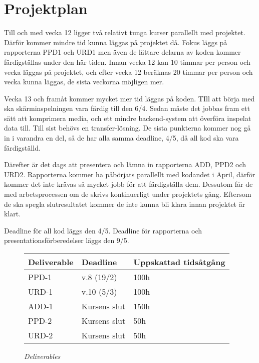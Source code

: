 
\section{Projektplan}
\label{sec:projektplan}
Till och med vecka 12 ligger två relativt tunga kurser parallellt med projektet. Därför kommer mindre tid kunna läggas på projektet då. Fokus läggs på rapporterna PPD1 och URD1 men även de lättare delarna av koden kommer färdigställas under den här tiden. Innan vecka 12 kan 10 timmar per person och vecka läggas på projektet, och efter vecka 12 beräknas 20 timmar per person och vecka kunna läggas, de sista veckorna möjligen mer.

Vecka 13 och framåt kommer mycket mer tid läggas på koden. TIll att börja med ska skärminspelningen vara färdig till den 6/4. Sedan måste det jobbas fram ett sätt att komprimera media, och ett mindre backend-system att överföra inspelat data till. Till sist behövs en transfer-lösning. De sista punkterna kommer nog gå in i varandra en del, så de har alla samma deadline, 4/5, då all kod ska vara färdigställd. 

Därefter är det dags att presentera och lämna in rapporterna ADD, PPD2 och URD2. Rapporterna kommer ha påbörjats parallellt med kodandet i April, därför kommer det inte krävas så mycket jobb för att färdigställa dem. Dessutom får de med arbetsprocessen om de skrivs kontinuerligt under projektets gång. Eftersom de ska spegla slutresultatet kommer de inte kunna bli klara innan projektet är klart. 

Deadline för all kod läggs den 4/5. Deadline för rapporterna och presentationsförberedelser läggs den 9/5. 

\begin{figure}[H]
\centering
\begin{tabular}{ | l | l | l |}
  \hline
  \textbf{Deliverable} & \textbf{Deadline} & \textbf{Uppskattad tidsåtgång} \\ \hline
  PPD-1 & v.8 (19/2) & 100h \\ \hline
  URD-1 & v.10 (5/3) & 100h \\ \hline
  ADD-1 & Kursens slut & 150h \\ \hline
  PPD-2 & Kursens slut & 50h \\ \hline
  URD-2 & Kursens slut & 50h \\ \hline
\end{tabular}
\caption*{\textit{Deliverables}}
\end{figure}

